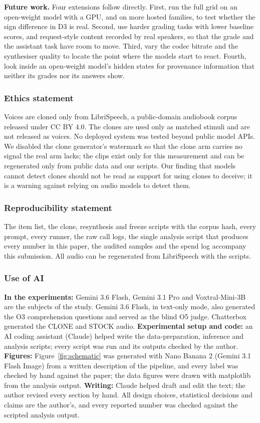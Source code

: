 \textbf{Future work.} Four extensions follow directly. First, run the full grid on an open-weight model with a GPU, and on more hosted families, to test whether the sign difference in D3 is real. Second, use harder grading tasks with lower baseline scores, and request-style content recorded by real speakers, so that the grade and the assistant task have room to move. Third, vary the codec bitrate and the synthesiser quality to locate the point where the models start to react. Fourth, look inside an open-weight model's hidden states for provenance information that neither its grades nor its answers show.

\subsubsection*{Ethics statement}
Voices are cloned only from LibriSpeech, a public-domain audiobook corpus released under CC BY 4.0. The clones are used only as matched stimuli and are not released as voices. No deployed system was tested beyond public model APIs. We disabled the clone generator's watermark so that the clone arm carries no signal the real arm lacks; the clips exist only for this measurement and can be regenerated only from public data and our scripts. Our finding that models cannot detect clones should not be read as support for using clones to deceive; it is a warning against relying on audio models to detect them.

\subsubsection*{Reproducibility statement}
The item list, the clone, resynthesis and freeze scripts with the corpus hash, every prompt, every runner, the raw call logs, the single analysis script that produces every number in this paper, the audited samples and the spend log accompany this submission. All audio can be regenerated from LibriSpeech with the scripts.

\subsubsection*{Use of AI}
\textbf{In the experiments:} Gemini 3.6 Flash, Gemini 3.1 Pro and Voxtral-Mini-3B are the subjects of the study. Gemini 3.6 Flash, in text-only mode, also generated the O3 comprehension questions and served as the blind O5 judge. Chatterbox generated the CLONE and STOCK audio. \textbf{Experimental setup and code:} an AI coding assistant (Claude) helped write the data-preparation, inference and analysis scripts; every script was run and its outputs checked by the author. \textbf{Figures:} Figure~\ref{fig:schematic} was generated with Nano Banana 2 (Gemini 3.1 Flash Image) from a written description of the pipeline, and every label was checked by hand against the paper; the data figures were drawn with matplotlib from the analysis output. \textbf{Writing:} Claude helped draft and edit the text; the author revised every section by hand. All design choices, statistical decisions and claims are the author's, and every reported number was checked against the scripted analysis output.
